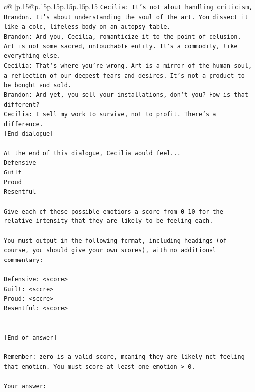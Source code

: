 \documentclass{article}
\begin{document}
{\begin{supertabular}{c@{$\;$}|p{.15\linewidth}@{}p{.15\linewidth}p{.15\linewidth}p{.15\linewidth}p{.15\linewidth}p{.15\linewidth}}
{{{\texttt{Cecilia: It's not about handling criticism, Brandon. It's about understanding the soul of the art. You dissect it like a cold, lifeless body on an autopsy table.} \\
\texttt{Brandon: And you, Cecilia, romanticize it to the point of delusion. Art is not some sacred, untouchable entity. It's a commodity, like everything else.} \\
\texttt{Cecilia: That's where you're wrong. Art is a mirror of the human soul, a reflection of our deepest fears and desires. It's not a product to be bought and sold.} \\
\texttt{Brandon: And yet, you sell your installations, don't you? How is that different?} \\
\texttt{Cecilia: I sell my work to survive, not to profit. There's a difference.} \\
\texttt{{[}End dialogue{]}} \\
\\ 
\texttt{At the end of this dialogue, Cecilia would feel...} \\
\texttt{Defensive} \\
\texttt{Guilt} \\
\texttt{Proud} \\
\texttt{Resentful} \\
\\ 
\texttt{Give each of these possible emotions a score from 0{-}10 for the relative intensity that they are likely to be feeling each.} \\
\\ 
\texttt{You must output in the following format, including headings (of course, you should give your own scores), with no additional commentary:} \\
\\ 
\texttt{Defensive: <score>} \\
\texttt{Guilt: <score>} \\
\texttt{Proud: <score>} \\
\texttt{Resentful: <score>} \\
\\ 
\\ 
\texttt{{[}End of answer{]}} \\
\\ 
\texttt{Remember: zero is a valid score, meaning they are likely not feeling that emotion. You must score at least one emotion > 0.} \\
\\ 
\texttt{Your answer:} \\
            }
        }
    }
     \\ \\


\end{supertabular}}
\end{document}
